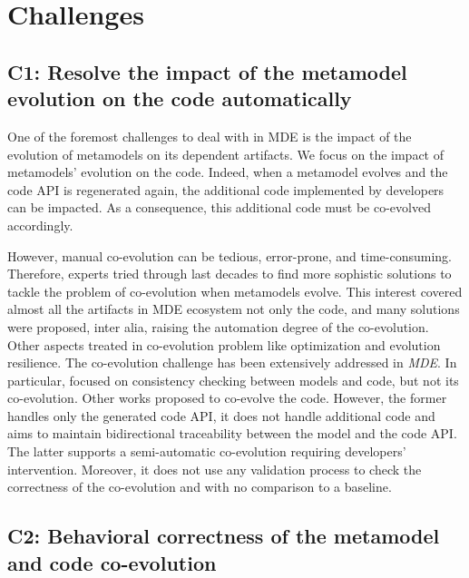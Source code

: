 \section*{Challenges}
\subsection*{C1: Resolve the impact of the metamodel evolution on the code automatically}
One of the foremost challenges to deal with in MDE is the impact of the evolution of metamodels on its dependent artifacts. We focus on the impact of metamodels' evolution on the code. 
Indeed, when a metamodel evolves and the code API is regenerated again, the additional code implemented by developers can be impacted.
	As a consequence, this additional code must be co-evolved accordingly.%

However, manual co-evolution can be tedious, error-prone, and time-consuming. 
Therefore, experts tried through last decades to find more sophistic solutions to tackle the problem of co-evolution when metamodels evolve. This interest covered almost all the artifacts in MDE ecosystem not only the code, and many solutions were proposed, inter alia, raising the automation degree of the co-evolution. Other aspects treated in co-evolution problem like optimization and evolution resilience.
The co-evolution challenge has been extensively addressed in \emph{MDE}. 
In particular, \cite{riedl2014towards,kanakis2019empirical,pham2017bidirectional,jongeling2020towards,jongeling2022Structural,zaheri2021towards} focused on consistency checking between models and code, but not its co-evolution.
Other works \cite{yu2012maintaining,Khelladi2020} proposed to co-evolve the code. However, the former handles only the generated code API, it does not handle additional code and aims to maintain bidirectional traceability between the model and the code API. The latter supports a semi-automatic co-evolution requiring developers' intervention. Moreover, it does not use any validation process to check the correctness of the co-evolution and with no comparison to a baseline. 

 

\subsection*{C2: Behavioral correctness of the metamodel and code co-evolution}


